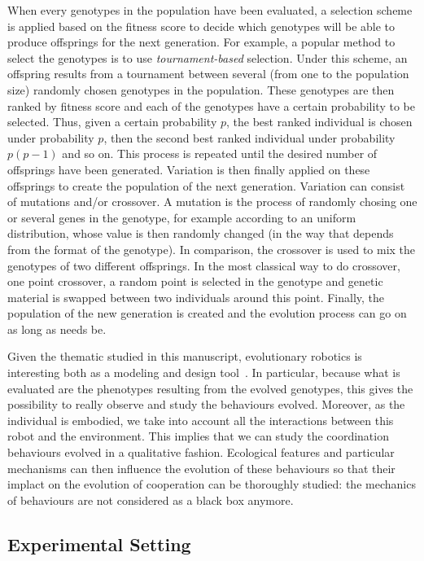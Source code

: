     When every genotypes in the population have been evaluated, a selection scheme is applied based on the fitness score to decide which genotypes will be able to produce offsprings for the next generation. For example, a popular method to select the genotypes is to use \emph{tournament-based} selection. Under this scheme, an offspring results from a tournament between several (from one to the population size) randomly chosen genotypes in the population. These genotypes are then ranked by fitness score and each of the genotypes have a certain probability to be selected. Thus, given a certain probability $p$, the best ranked individual is chosen under probability $p$, then the second best ranked individual under probability $p(p-1)$ and so on. This process is repeated until the desired number of offsprings have been generated. Variation is then finally applied on these offsprings to create the population of the next generation. Variation can consist of mutations and/or crossover. A mutation is the process of randomly chosing one or several genes in the genotype, for example according to an uniform distribution, whose value is then randomly changed (in the way that depends from the format of the genotype). In comparison, the crossover is used to mix the genotypes of two different offsprings. In the most classical way to do crossover, one point crossover, a random point is selected in the genotype and genetic material is swapped between two individuals around this point. Finally, the population of the new generation is created and the evolution process can go on as long as needs be.

    Given the thematic studied in this manuscript, evolutionary robotics is interesting both as a modeling and design tool~\parencite{Trianni2014b, Doncieux2015a}. In particular, because what is evaluated are the phenotypes resulting from the evolved genotypes, this gives the possibility to really observe and study the behaviours evolved. Moreover, as the individual is embodied, we take into account all the interactions between this robot and the environment. This implies that we can study the coordination behaviours evolved in a qualitative fashion. Ecological features and particular mechanisms can then influence the evolution of these behaviours so that their implact on the evolution of cooperation can be thoroughly studied: the mechanics of behaviours are not considered as a black box anymore.



  \subsection{Experimental Setting}

